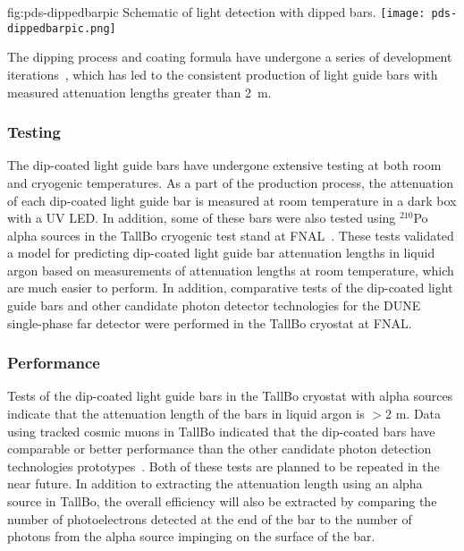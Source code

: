 \begin{dunefigure}{fig:pds-dippedbarpic}
{Schematic of light detection with dipped bars.}
  \texttt{[image: pds-dippedbarpic.png]}
\end{dunefigure}

The dipping process and coating formula have undergone a series of development iterations~\cite{Z. Moss et al 2015 JINST 10 P08017, Z. Moss et al 2016, arXiv:1604.03103v1}, which has led to the consistent production of light guide bars with measured attenuation lengths greater than 2~m. 

\subsubsection{Testing}

The dip-coated light guide bars have undergone extensive testing at both room and cryogenic temperatures.  As a part of the production process, the attenuation of each dip-coated light guide bar is measured at room temperature in a dark box with a UV LED.  In addition, some of these bars were also tested using $^{210}$Po alpha sources in the TallBo cryogenic test stand at FNAL~\cite{Z. Moss et al 2015 JINST 10 P08017, Z. Moss et al 2016}.  These tests validated a model for predicting dip-coated light guide bar attenuation lengths in liquid argon based on measurements of attenuation lengths at room temperature, which are much easier to perform.  In addition, comparative tests of the dip-coated light guide bars and other candidate photon detector technologies for the DUNE single-phase far detector were performed in the TallBo cryostat at FNAL.

\subsubsection{Performance}

Tests of the dip-coated light guide bars in the TallBo cryostat with alpha sources indicate that the attenuation length of the bars in liquid argon is $>2$ m.  Data using tracked cosmic muons in TallBo indicated that the dip-coated bars have comparable or better performance than the other candidate photon detection technologies prototypes~\cite{D. Whittington 2016 JINST 11 C05019}. Both of these tests are planned to be repeated in the near future.  In addition to extracting the attenuation length using an alpha source in TallBo, the overall efficiency will also be extracted by comparing the number of photoelectrons detected at the end of the bar to the number of photons from the alpha source impinging on the surface of the bar.

